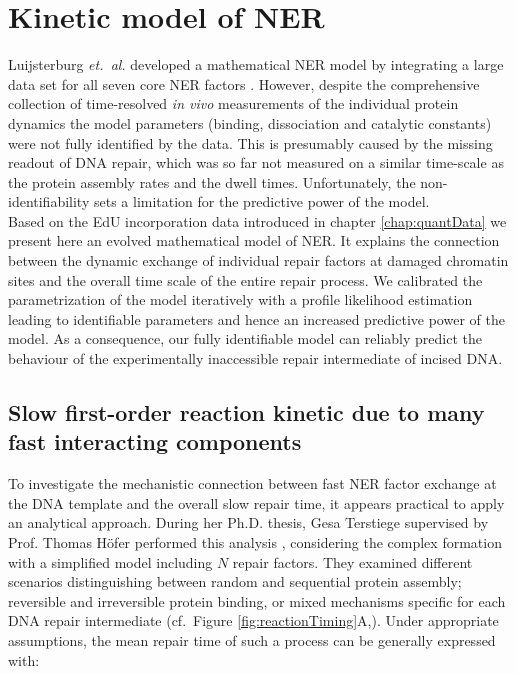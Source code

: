 \chapter{Kinetic model of NER}

Luijsterburg \textit{et.\ al.} developed a mathematical NER model by integrating a large data set for all seven core NER factors \cite{Luijsterburg2010}. However, despite the comprehensive collection of time-resolved \textit{in vivo} measurements of the individual protein dynamics the model parameters (binding, dissociation and catalytic constants) were not fully identified by the data. This is presumably caused by the missing readout of DNA repair, which was so far not measured on a similar time-scale as the protein assembly rates and the dwell times. Unfortunately, the non-identifiability sets a limitation for the predictive power of the model. \\ 
Based on the EdU incorporation data introduced in chapter \ref{chap:quantData} we present here an evolved mathematical model of NER. It explains the connection between the dynamic exchange of individual repair factors at damaged chromatin sites and the overall time scale of the entire repair process. We calibrated the parametrization of the model iteratively with a profile likelihood estimation leading to identifiable parameters and hence an increased predictive power of the model. As a consequence, our fully identifiable model can reliably predict the behaviour of the experimentally inaccessible repair intermediate of incised DNA.\\
   



\section{Slow first-order reaction kinetic due to many fast interacting components}
\label{sec:toyModel}
To investigate the mechanistic connection between fast NER factor exchange at the DNA template and the overall slow repair time, it appears practical to apply an analytical approach. During her Ph.D. thesis, Gesa Terstiege supervised by Prof. Thomas H\"ofer performed this analysis \cite{Terstiege2010,Verbruggen2014}, considering the complex formation with a simplified model including $N$ repair factors. They examined different scenarios distinguishing between random and sequential protein assembly; reversible and irreversible protein binding, or mixed mechanisms specific for each DNA repair intermediate (cf.\ Figure \ref{fig:reactionTiming}A,\cite{Verbruggen2014}). Under appropriate assumptions, the mean repair time of such a process can be generally expressed with:

